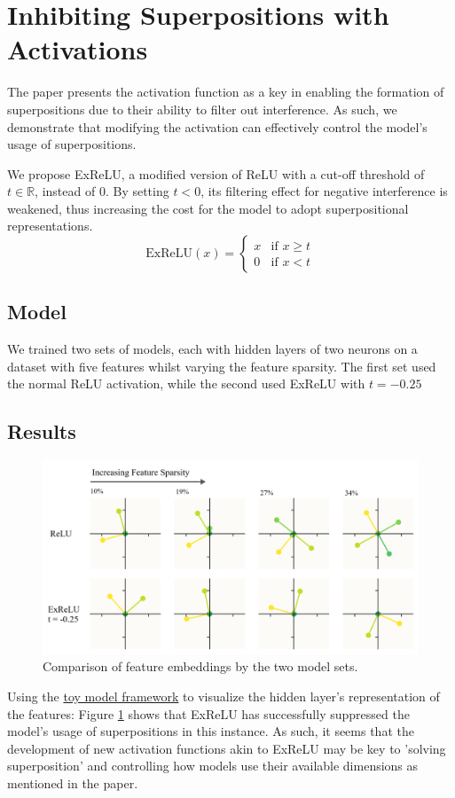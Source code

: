\section{Inhibiting Superpositions with Activations}
\label{sec:act_fns}
The paper presents the activation function as a key in enabling the formation of superpositions due to their ability to
filter out interference. As such, we demonstrate that modifying the activation can effectively control the model's usage of
superpositions.

We propose ExReLU, a modified version of ReLU with a cut-off threshold of $t \in \mathbb{R}$, instead of $0$. By setting $t < 0$, its filtering effect for negative interference is weakened, thus
increasing the cost for the model to adopt superpositional representations.
\[
	\text{ExReLU}(x) =
	\begin{cases}
		x & \text{if } x \geq t \\
		0 & \text{if } x < t
	\end{cases}
\]

\subsection{Model}
We trained two sets of models, each with hidden layers of two neurons on a dataset with five features whilst varying the feature
sparsity. The first set used the normal ReLU activation, while the second used ExReLU with $t=-0.25$

\subsection{Results}
\begin{figure}[h]
	\centering
	\includegraphics[width=1\linewidth]{figures/acts_diagram.png}
	\caption{Comparison of feature embeddings by the two model sets.}
	\label{fig:acts_diagram}
\end{figure}
Using the \href{https://colab.research.google.com/github/anthropics/toy-models-of-superposition/blob/main/toy_models.ipynb}{toy model framework} to visualize the hidden layer's representation of the features:
Figure \ref{fig:acts_diagram} shows that ExReLU has successfully suppressed the model's usage of superpositions in this instance.
As such, it seems that the development of new activation functions akin to ExReLU may be key to 'solving superposition' and controlling how models
use their available dimensions as mentioned in the paper.
